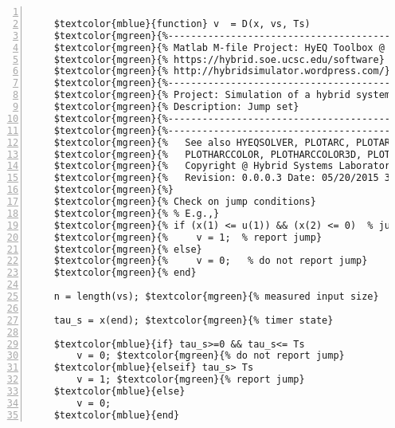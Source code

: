 %  
%  
%  
%  
  
  
\DefineShortVerb[fontfamily=courier,fontseries=m]{\$} 
\DefineShortVerb[fontfamily=courier,fontseries=b]{\#} 
  
\begin{Verbatim}[commandchars=\$\{\},numbers=left,numbersep=2pt] 

    $textcolor{mblue}{function} v  = D(x, vs, Ts)  
    $textcolor{mgreen}{%--------------------------------------------------------------------------} 
    $textcolor{mgreen}{% Matlab M-file Project: HyEQ Toolbox @  Hybrid Systems Laboratory (HSL), } 
    $textcolor{mgreen}{% https://hybrid.soe.ucsc.edu/software} 
    $textcolor{mgreen}{% http://hybridsimulator.wordpress.com/} 
    $textcolor{mgreen}{%--------------------------------------------------------------------------} 
    $textcolor{mgreen}{% Project: Simulation of a hybrid system Zero-order hold (ZOH) } 
    $textcolor{mgreen}{% Description: Jump set} 
    $textcolor{mgreen}{%--------------------------------------------------------------------------} 
    $textcolor{mgreen}{%--------------------------------------------------------------------------} 
    $textcolor{mgreen}{%   See also HYEQSOLVER, PLOTARC, PLOTARC3, PLOTFLOWS, PLOTHARC,} 
    $textcolor{mgreen}{%   PLOTHARCCOLOR, PLOTHARCCOLOR3D, PLOTHYBRIDARC, PLOTJUMPS.} 
    $textcolor{mgreen}{%   Copyright @ Hybrid Systems Laboratory (HSL),} 
    $textcolor{mgreen}{%   Revision: 0.0.0.3 Date: 05/20/2015 3:42:00} 
    $textcolor{mgreen}{%} 
    $textcolor{mgreen}{% Check on jump conditions} 
    $textcolor{mgreen}{% % E.g.,} 
    $textcolor{mgreen}{% if (x(1) <= u(1)) && (x(2) <= 0)  % jump condition} 
    $textcolor{mgreen}{%     v = 1;  % report jump} 
    $textcolor{mgreen}{% else} 
    $textcolor{mgreen}{%     v = 0;   % do not report jump} 
    $textcolor{mgreen}{% end} 
     
    n = length(vs); $textcolor{mgreen}{% measured input size} 
     
    tau_s = x(end); $textcolor{mgreen}{% timer state} 
     
    $textcolor{mblue}{if} tau_s>=0 && tau_s<= Ts 
        v = 0; $textcolor{mgreen}{% do not report jump} 
    $textcolor{mblue}{elseif} tau_s> Ts 
        v = 1; $textcolor{mgreen}{% report jump} 
    $textcolor{mblue}{else} 
        v = 0; 
    $textcolor{mblue}{end}  
\end{Verbatim}  
  
\UndefineShortVerb{\$} 
\UndefineShortVerb{\#} 
 